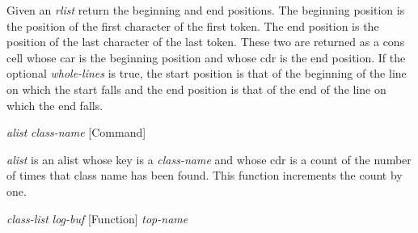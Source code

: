 \begin{doc-string}
Given an \emph{rlist} return the beginning and end positions.  The beginning position is
the position of the first character of the first token.  The end position is the
position of the last character of the last token.  These two are returned as a cons
cell whose car is the beginning position and whose cdr is the end position.  If
the optional \emph{whole-lines} is true, the start position is that of the beginning of
the line on which the start falls and the end position is that of the end of
the line on which the end falls.
\end{doc-string}

\vspace{1em}
\noindent
{}
\usebox{\funcname}\emph{alist} \emph{class-name}
 \hfill [Command]

\begin{doc-string}
\emph{alist} is an alist whose key is a \emph{class-name} and whose cdr is a count of the
number of times that class name has been found.  This function increments the
count by one.
\end{doc-string}

\vspace{1em}
\noindent
{}
\usebox{\funcname}\emph{class-list} \emph{log-buf}
 \hfill [Function]
\hspace*{\wd\funcname}\emph{top-name}

